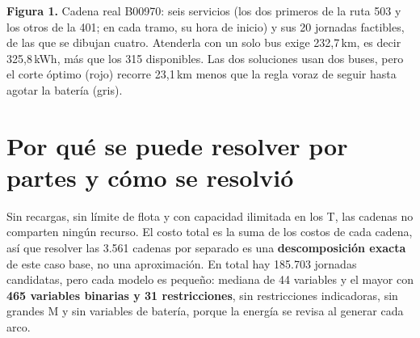 \documentclass[fontsize=10.5pt,a4paper]{scrartcl}
\begin{document}
\begin{center}
\end{center}
\vspace{-6pt}
{\small\textbf{Figura 1.} Cadena real B00970: seis servicios (los dos primeros de la ruta 503 y los otros de la 401; en cada tramo, su hora de inicio) y sus 20 jornadas factibles, de las que se dibujan cuatro. Atenderla con un solo bus exige 232,7\,km, es decir 325,8\,kWh, más que los 315 disponibles. Las dos soluciones usan dos buses, pero el corte óptimo (rojo) recorre 23,1\,km menos que la regla voraz de seguir hasta agotar la batería (gris).\par}

\section{Por qué se puede resolver por partes y cómo se resolvió}

Sin recargas, sin límite de flota y con capacidad ilimitada en los T, las cadenas no comparten ningún recurso. El costo total es la suma de los costos de cada cadena, así que resolver las 3.561 cadenas por separado es una \textbf{descomposición exacta} de este caso base, no una aproximación. En total hay 185.703 jornadas candidatas, pero cada modelo es pequeño: mediana de 44 variables y el mayor con \textbf{465 variables binarias y 31 restricciones}, sin restricciones indicadoras, sin grandes M y sin variables de batería, porque la energía se revisa al generar cada arco.
\end{document}
